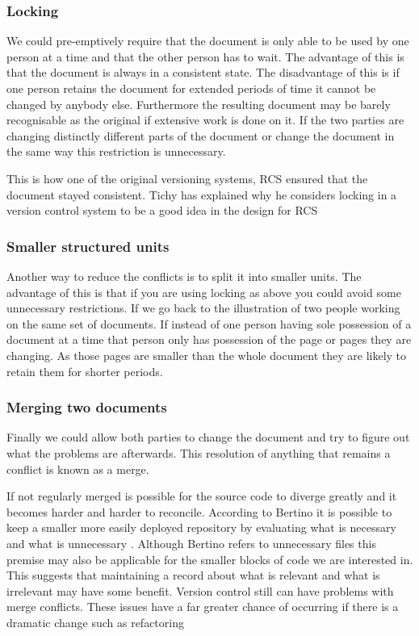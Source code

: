 \subsubsection{Locking}
We could pre-emptively require that the document is only able to be used by one person at a time and that the other person has to wait. The advantage of this is that the document is always in a consistent state. The disadvantage of this is if one person retains the document for extended periods of time it cannot be changed by anybody else. Furthermore the resulting document may be barely recognisable as the original if extensive work is done on it. If the two parties are changing distinctly different parts of the document or change the document in the same way this restriction is unnecessary.

This is how one of the original versioning systems, RCS ensured that the document stayed consistent. Tichy has explained why he considers locking in a version control system to be a good idea in the design for RCS\cite{Tichy1982}

\subsubsection{Smaller structured units}
Another way to reduce the conflicts is to split it into smaller units.  The advantage of this is that if you are using locking as above you could avoid some unnecessary restrictions. If we go back to the illustration of two people working on the same set of documents.  If instead of one person having sole possession of a document at a time that person only has possession of the page or pages they are changing. As those pages are smaller than the whole document they are likely to retain them for shorter periods.
\subsubsection{Merging two documents}
Finally we could allow both parties to change the document and try to figure out what the problems are afterwards.  This resolution of anything that remains a conflict is known as a merge.

If not regularly merged is possible for the source code to diverge greatly and it becomes harder and harder to reconcile.
 According to Bertino it is possible to keep a smaller more easily deployed repository by evaluating what is necessary and what is unnecessary \cite{Bertino2012}. Although Bertino refers to unnecessary files this premise may also be applicable for the smaller blocks of code we are interested in. This suggests that maintaining a record about what is relevant and what is irrelevant may have some benefit. Version control still can have problems with merge conflicts. These issues have a far greater chance of occurring if there is a dramatic change such as refactoring
 
